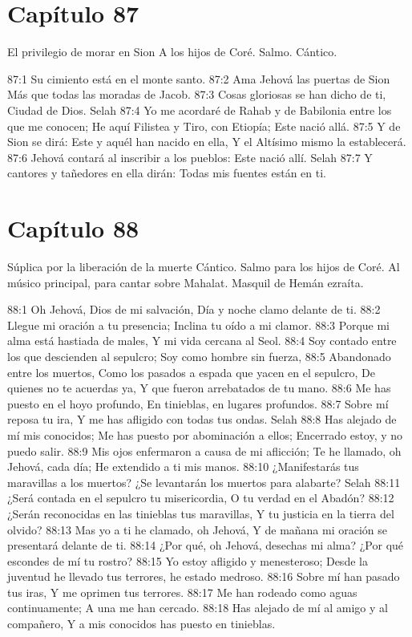\section*{Capítulo 87}
El privilegio de morar en Sion 
A los hijos de Coré. Salmo. Cántico. 
 
87:1 Su cimiento está en el monte santo. 
87:2 Ama Jehová las puertas de Sion 
Más que todas las moradas de Jacob. 
87:3 Cosas gloriosas se han dicho de ti, 
Ciudad de Dios. Selah 
87:4 Yo me acordaré de Rahab y de Babilonia entre los que me conocen; 
He aquí Filistea y Tiro, con Etiopía; 
Este nació allá. 
87:5 Y de Sion se dirá: Este y aquél han nacido en ella, 
Y el Altísimo mismo la establecerá. 
87:6 Jehová contará al inscribir a los pueblos: 
Este nació allí. Selah 
87:7 Y cantores y tañedores en ella dirán: 
Todas mis fuentes están en ti. 
\section*{Capítulo 88}
Súplica por la liberación de la muerte 
Cántico. Salmo para los hijos de Coré. Al músico principal, para cantar sobre Mahalat. Masquil de Hemán ezraíta. 
 
88:1 Oh Jehová, Dios de mi salvación, 
Día y noche clamo delante de ti. 
88:2 Llegue mi oración a tu presencia; 
Inclina tu oído a mi clamor. 
88:3 Porque mi alma está hastiada de males, 
Y mi vida cercana al Seol. 
88:4 Soy contado entre los que descienden al sepulcro; 
Soy como hombre sin fuerza, 
88:5 Abandonado entre los muertos, 
Como los pasados a espada que yacen en el sepulcro, 
De quienes no te acuerdas ya, 
Y que fueron arrebatados de tu mano. 
88:6 Me has puesto en el hoyo profundo, 
En tinieblas, en lugares profundos. 
88:7 Sobre mí reposa tu ira, 
Y me has afligido con todas tus ondas. Selah 
88:8 Has alejado de mí mis conocidos; 
Me has puesto por abominación a ellos; 
Encerrado estoy, y no puedo salir. 
88:9 Mis ojos enfermaron a causa de mi aflicción; 
Te he llamado, oh Jehová, cada día; 
He extendido a ti mis manos. 
88:10 ¿Manifestarás tus maravillas a los muertos? 
¿Se levantarán los muertos para alabarte? Selah 
88:11 ¿Será contada en el sepulcro tu misericordia, 
O tu verdad en el Abadón? 
88:12 ¿Serán reconocidas en las tinieblas tus maravillas, 
Y tu justicia en la tierra del olvido? 
88:13 Mas yo a ti he clamado, oh Jehová, 
Y de mañana mi oración se presentará delante de ti. 
88:14 ¿Por qué, oh Jehová, desechas mi alma? 
¿Por qué escondes de mí tu rostro? 
88:15 Yo estoy afligido y menesteroso; 
Desde la juventud he llevado tus terrores, he estado medroso. 
88:16 Sobre mí han pasado tus iras, 
Y me oprimen tus terrores. 
88:17 Me han rodeado como aguas continuamente; 
A una me han cercado. 
88:18 Has alejado de mí al amigo y al compañero, 
Y a mis conocidos has puesto en tinieblas. 
